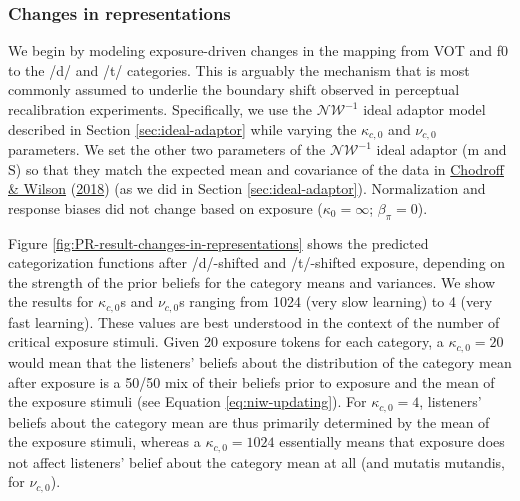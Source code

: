 \documentclass[
  11pt,
  english,
  man,floatsintext]{apa6}
\begin{document}
\hypertarget{changes-in-representations}{%
\subsubsection{Changes in representations}\label{changes-in-representations}}

We begin by modeling exposure-driven changes in the mapping from VOT and f0 to the /d/ and /t/ categories. This is arguably the mechanism that is most commonly assumed to underlie the boundary shift observed in perceptual recalibration experiments. Specifically, we use the \(\mathcal{NW}^{-1}\) ideal adaptor model described in Section \ref{sec:ideal-adaptor} while varying the \(\kappa_{c,0}\) and \(\nu_{c,0}\) parameters. We set the other two parameters of the \(\mathcal{NW}^{-1}\) ideal adaptor (\(\mathrm{m}\) and \(\mathrm{S}\)) so that they match the expected mean and covariance of the data in \protect\hyperlink{ref-chodroff-wilson2018}{Chodroff \& Wilson} (\protect\hyperlink{ref-chodroff-wilson2018}{2018}) (as we did in Section \ref{sec:ideal-adaptor}). Normalization and response biases did not change based on exposure (\(\kappa_0 = \infty\); \(\beta_{\pi}=0\)).

Figure \ref{fig:PR-result-changes-in-representations} shows the predicted categorization functions after /d/-shifted and /t/-shifted exposure, depending on the strength of the prior beliefs for the category means and variances. We show the results for \(\kappa_{c,0}\)s and \(\nu_{c,0}\)s ranging from 1024 (very slow learning) to 4 (very fast learning). These values are best understood in the context of the number of critical exposure stimuli. Given 20 exposure tokens for each category, a \(\kappa_{c,0}=20\) would mean that the listeners' beliefs about the distribution of the category mean after exposure is a 50/50 mix of their beliefs prior to exposure and the mean of the exposure stimuli (see Equation \eqref{eq:niw-updating}). For \(\kappa_{c,0}=4\), listeners' beliefs about the category mean are thus primarily determined by the mean of the exposure stimuli, whereas a \(\kappa_{c,0}=1024\) essentially means that exposure does not affect listeners' belief about the category mean at all (and mutatis mutandis, for \(\nu_{c,0}\)).
\end{document}
